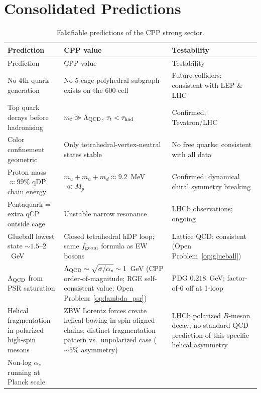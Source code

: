 \documentclass[11pt,a4paper]{article}
\newcommand{\as}{\alpha_s}
\begin{document}
\section{Consolidated Predictions}
\label{sec:predictions}

\begin{longtable}{@{}p{5.2cm}p{4cm}p{3.5cm}@{}}
\caption{Falsifiable predictions of the CPP strong sector.}
\label{tab:predictions}\\
\toprule
Prediction & CPP value & Testability \\
\midrule
\endfirsthead
\toprule
Prediction & CPP value & Testability \\
\midrule
\endhead
\bottomrule
\endfoot
No 4th quark generation
  & No 5-cage polyhedral subgraph exists on the 600-cell
  & Future colliders; consistent with LEP \& LHC \\[4pt]
Top quark decays before hadronising
  & $m_t \gg \Lambda_{\rm QCD}$, $\tau_t < \tau_{\rm had}$
  & Confirmed; Tevatron/LHC \\[4pt]
Color confinement geometric
  & Only tetrahedral-vertex-neutral states stable
  & No free quarks; consistent with all data \\[4pt]
Proton mass $\approx99\%$ qDP chain energy
  & $m_u{+}m_u{+}m_d \approx 9.2$~MeV~$\ll M_p$
  & Confirmed; dynamical chiral symmetry breaking \\[4pt]
Pentaquark = extra qCP outside cage
  & Unstable narrow resonance
  & LHCb observations; ongoing \\[4pt]
Glueball lowest state $\sim1.5$--$2$~GeV
  & Closed tetrahedral hDP loop; same $f_{\rm geom}$ formula as EW bosons
  & Lattice QCD; consistent (Open Problem~\ref{op:glueball}) \\[4pt]
$\Lambda_{\rm QCD}$ from PSR saturation
  & $\Lambda_{\rm QCD} \sim \sqrt{\sigma/\alpha_s} \sim 1$~GeV
  (CPP order-of-magnitude; RGE self-consistent value: Open
  Problem~\ref{op:lambda_psr})
  & PDG $0.218$~GeV; factor-of-6 off at 1-loop \\[4pt]
Helical fragmentation in polarized high-spin mesons
  & ZBW Lorentz forces create helical bowing in spin-aligned chains;
  distinct fragmentation pattern vs.\ unpolarized case
  ($\sim 5\%$ asymmetry)
  & LHCb polarized $B$-meson decay; no standard QCD prediction of
  this specific helical asymmetry \\[4pt]
Non-log $\as$ running at Planck scale

\end{longtable}
\end{document}
